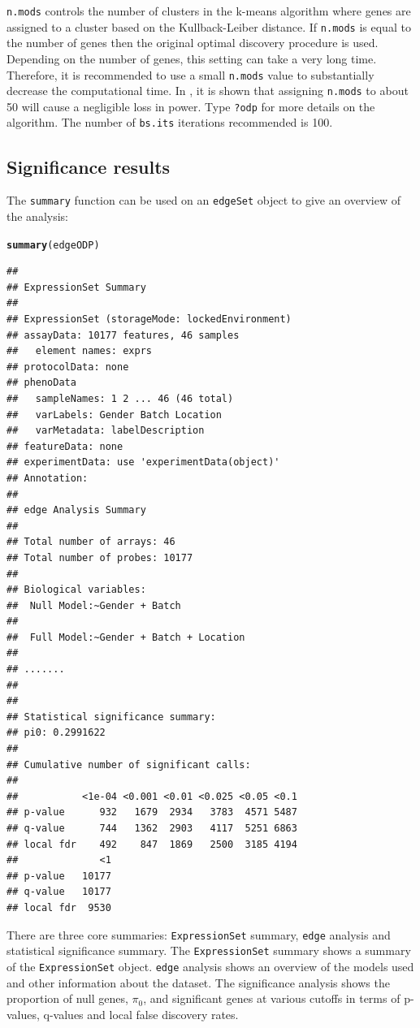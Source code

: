 \documentclass{article}\usepackage[]{graphicx}\usepackage[]{color}
\makeatletter
\newcommand{\hlstd}[1]{\textcolor[rgb]{0.345,0.345,0.345}{#1}}%
\newcommand{\hlkwd}[1]{\textcolor[rgb]{0.737,0.353,0.396}{\textbf{#1}}}%
\newenvironment{kframe}{%
 \def\at@end@of@kframe{}%
 \ifinner\ifhmode%
  \def\at@end@of@kframe{\end{minipage}}%
  \begin{minipage}{\columnwidth}%
 \fi\fi%
 \def\FrameCommand##1{\hskip\@totalleftmargin \hskip-\fboxsep
 \colorbox{shadecolor}{##1}\hskip-\fboxsep
     \hskip-\linewidth \hskip-\@totalleftmargin \hskip\columnwidth}%
 \MakeFramed {\advance\hsize-\width
   \@totalleftmargin\z@ \linewidth\hsize
   \@setminipage}}%
 {\par\unskip\endMakeFramed%
 \at@end@of@kframe}
\newenvironment{knitrout}{}{} %
\makeatother
\begin{document}
{\tt n.mods} controls the number of clusters in the k-means algorithm where genes are assigned to a cluster based on the Kullback-Leiber distance. If {\tt n.mods} is equal to the number of genes then the original optimal discovery procedure is used. Depending on the number of genes, this setting can take a very long time.  Therefore, it is recommended to use a small {\tt n.mods} value to substantially decrease the computational time. In \cite{woo:leek:storey:2011}, it is shown that assigning {\tt n.mods} to about 50 will cause a negligible loss in power. Type {\tt ?odp} for more details on the algorithm. The number of {\tt bs.its} iterations recommended is 100.

\subsection{Significance results}
The {\tt summary} function can be used on an {\tt edgeSet} object to give an overview of the analysis:
\begin{knitrout}
\color{fgcolor}\begin{kframe}
\begin{alltt}
\hlkwd{summary}\hlstd{(edgeODP)}
\end{alltt}
\begin{verbatim}
## 
## ExpressionSet Summary 
##  
## ExpressionSet (storageMode: lockedEnvironment)
## assayData: 10177 features, 46 samples 
##   element names: exprs 
## protocolData: none
## phenoData
##   sampleNames: 1 2 ... 46 (46 total)
##   varLabels: Gender Batch Location
##   varMetadata: labelDescription
## featureData: none
## experimentData: use 'experimentData(object)'
## Annotation:  
## 
## edge Analysis Summary 
##  
## Total number of arrays: 46 
## Total number of probes: 10177 
##  
## Biological variables: 
## 	Null Model:~Gender + Batch
## 
## 	Full Model:~Gender + Batch + Location
## 
## ....... 
##  
## 
## Statistical significance summary:
## pi0:	0.2991622	
## 
## Cumulative number of significant calls:
## 
##           <1e-04 <0.001 <0.01 <0.025 <0.05 <0.1
## p-value      932   1679  2934   3783  4571 5487
## q-value      744   1362  2903   4117  5251 6863
## local fdr    492    847  1869   2500  3185 4194
##              <1
## p-value   10177
## q-value   10177
## local fdr  9530
\end{verbatim}
\end{kframe}
\end{knitrout}
There are three core summaries: {\tt ExpressionSet} summary, {\tt edge} analysis and statistical significance summary. The {\tt ExpressionSet} summary shows a summary of the {\tt ExpressionSet} object. {\tt edge} analysis shows an overview of the models used and other information about the dataset. The significance analysis shows the proportion of null genes, $\pi_{0}$, and significant genes at various cutoffs in terms of p-values, q-values and local false discovery rates.
\end{document}
